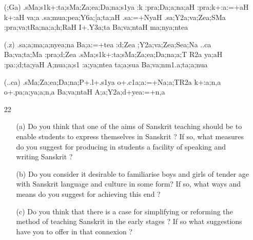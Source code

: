 \begin{itemize}
\begin{itemize}
          \item[({\sktf ;Ga})] {\sktf .sMa;s1k+:ta;sMa;Za;ea;Da;na;s1ya :k :pra;Da;a;na;aH
:pra;k+:a:=+aH k+:aH va;a .sa;mua;pea;Y6a;[a;ta;aH
.sa:=+NyaH .sa{;Y2a;va};Zea;SMa :pra;va;tRa;na;a;h;RaH\ZF{,} I+.Y3a;ta Ba;va;ntaH
ma;nya;ntea }
          
          \item[({\sktf .z})] {\sktf .sa;a;ma;a;nyea;na Ba;a:=+tea
:d;Zea\ZF{,} ;Y2a;va;Zea;Sea;Na ..ca Ba;va;ta;Ma
:pra;d;Zea\ZF{,} .sMa;s1k+:ta;sMa;Za;ea;Da;na;a;T%
R2a ya;aH :pa:;d;ta;yaH A;nua;a;s1%
:a;ya;ntea\ZF{,} ta;a;sua Ba;va;nm1.a;ta;a;nua}
          
          \item[({\sktf ..ca})] {\sktf .sMa;Za;ea;Da;na;P+.l+.s1ya
o+.c1a;a:=+Na;a;TR2a k+:a;n,a o+.pa;a;ya;a;n,a Ba;va;ntaH
A;a;Y2a;d+yea:=+n,a }
          
          \end{itemize}
\end{itemize}

{\rm 
\begin{itemize}

\item[22]  \begin{itemize}                 
             \item[(a)] Do you think that one of the aims of Sanskrit teaching should be to enable students to express themselves in Sanskrit ? If so, what measures do you suggest for producing in students a facility of speaking and writing Sanskrit ?
             
             \item[(b)] Do you consider it desirable to familiarise boys and girls of tender age with Sanskrit language and culture in some form? If so, what ways and means do you suggest for achieving this end ?
             
             \item[(c)] Do you think that there is a case for simplifying or reforming the method of teaching Sanskrit in the early stages ? If so what suggestions have you to offer in that connexion ?
             
             \end{itemize}
              
\end{itemize}
}
